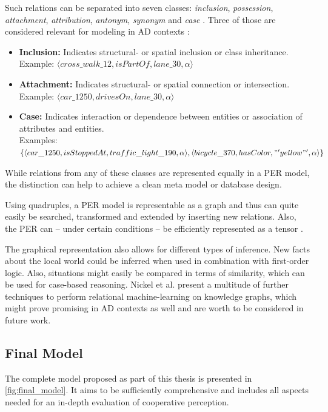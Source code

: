 Such relations can be separated into seven classes: \textit{inclusion}, \textit{possession}, \textit{attachment}, \textit{attribution}, \textit{antonym}, \textit{synonym} and \textit{case} \cite{Storey1993}. Three of those are considered relevant for modeling in AD contexts \cite{Petrich2018}:

\begin{itemize}
	\item \textbf{Inclusion:} Indicates structural- or spatial inclusion or class inheritance. \\ Example: $\langle  cross\_walk\_12, isPartOf, lane\_30, \alpha \rangle$
	\item \textbf{Attachment:} Indicates structural- or spatial connection or intersection. \\ Example: $\langle car\_1250, drivesOn, lane\_30, \alpha \rangle$
	\item \textbf{Case:} Indicates interaction or dependence between entities or association of attributes and entities. \\ Examples: $\{ \langle car\_1250, isStoppedAt, traffic\_light\_190, \alpha \rangle, \langle bicycle\_370, hasColor, \\ "'yellow"', \alpha \rangle \}$
\end{itemize}

While relations from any of these classes are represented equally in a PER model, the distinction can help to achieve a clean meta model or database design.
\par
\bigskip

Using quadruples, a PER model is representable as a graph and thus can quite easily be searched, transformed and extended by inserting new relations. Also, the PER can – under certain conditions – be efficiently represented as a tensor \cite{Petrich2018}.

The graphical representation also allows for different types of inference. New facts about the local world could be inferred when used in combination with first-order logic. Also, situations might easily be compared in terms of similarity, which can be used for case-based reasoning. Nickel et al. \cite{Nickel2016} present a multitude of further techniques to perform relational machine-learning on knowledge graphs, which might prove promising in AD contexts as well and are worth to be considered in future work.

\subsection{Final Model}
\label{subsec:concept_design:the_final_model}
The complete model proposed as part of this thesis is presented in \cref{fig:final_model}. It aims to be sufficiently comprehensive and includes all aspects needed for an in-depth evaluation of cooperative perception. 

